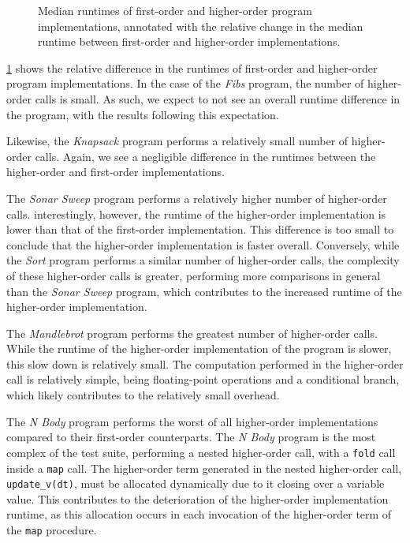 \begin{figure}[ht]
  \centering
  \caption[Median runtimes of first-order and higher-order program implementations.]{Median runtimes of first-order and higher-order program implementations, annotated with the relative change in the median runtime between first-order and higher-order implementations.}
  \label{fig:plot-order}
\end{figure}

\cref{fig:plot-order} shows the relative difference in the runtimes of first-order and higher-order program implementations. In the case of the \textit{Fibs} program, the number of higher-order calls is small. As such, we expect to not see an overall runtime difference in the program, with the results following this expectation. 

Likewise, the \textit{Knapsack} program performs a relatively small number of higher-order calls. Again, we see a negligible difference in the runtimes between the higher-order and first-order implementations. 

The \textit{Sonar Sweep} program performs a relatively higher number of higher-order calls. interestingly, however, the runtime of the higher-order implementation is lower than that of the first-order implementation. This difference is too small to conclude that the higher-order implementation is faster overall. Conversely, while the \textit{Sort} program performs a similar number of higher-order calls, the complexity of these higher-order calls is greater, performing more comparisons in general than the \textit{Sonar Sweep} program, which contributes to the increased runtime of the higher-order implementation. 

The \textit{Mandlebrot} program performs the greatest number of higher-order calls. While the runtime of the higher-order implementation of the program is slower, this slow down is relatively small. The computation performed in the higher-order call is relatively simple, being floating-point operations and a conditional branch, which likely contributes to the relatively small overhead.

The \textit{N Body} program performs the worst of all higher-order implementations compared to their first-order counterparts. The \textit{N Body} program is the most complex of the test suite, performing a nested higher-order call, with a \texttt{fold} call inside a \texttt{map} call. The higher-order term generated in the nested higher-order call, \texttt{update\_v(dt)}, must be allocated dynamically due to it closing over a variable value. This contributes to the deterioration of the higher-order implementation runtime, as this allocation occurs in each invocation of the higher-order term of the \texttt{map} procedure.

